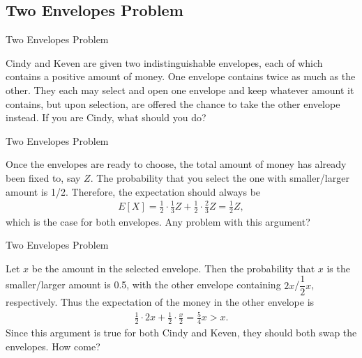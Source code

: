 \subsection{Two Envelopes Problem}

\begin{frame}{Two Envelopes Problem}

\justifying
{} Cindy and Keven are given two indistinguishable envelopes, each of which contains a positive amount of money. One envelope contains twice as much as the other. They each may select and open one envelope and keep whatever amount it contains, but upon selection, are offered the chance to take the other envelope instead. If you are Cindy, what should you do?

\end{frame}

\begin{frame}{Two Envelopes Problem}

\justifying
{} Once the envelopes are ready to choose, the total amount of money has already been fixed to, say $Z$. The probability that you select the one with smaller/larger amount is 1/2. Therefore, the expectation should always be
\begin{align*}
E[X] = \frac{1}{2} \cdot \frac{1}{3}Z + \frac{1}{2} \cdot \frac{2}{3}Z = \frac{1}{2}Z,
\end{align*}
which is the case for both envelopes. Any problem with this argument?

\end{frame}

\begin{frame}{Two Envelopes Problem}

\justifying
{} Let $x$ be the amount in the selected envelope. Then the probability that $x$ is the smaller/larger amount is 0.5, with the other envelope containing $2x$/$\dfrac{1}{2}x$, respectively. Thus the expectation of the money in the other envelope is
\begin{align*}
\frac{1}{2}\cdot 2x + \frac{1}{2} \cdot \frac{x}{2} = \frac{5}{4}x > x.
\end{align*}
Since this argument is true for both Cindy and Keven, they should both swap the envelopes. How come?

\end{frame}

